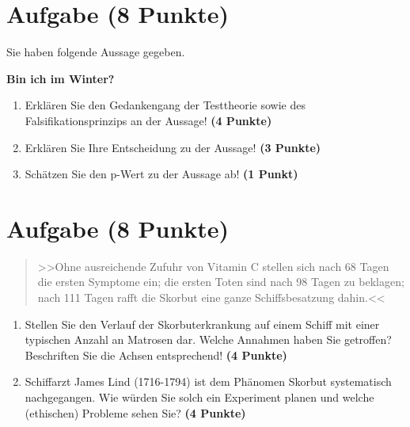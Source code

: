 \documentclass[a4paper, 10pt]{scrartcl}\usepackage[]{graphicx}\usepackage[]{xcolor}
\begin{document}
\clearpage

\section{Aufgabe \hfill (8 Punkte)}



Sie haben folgende Aussage gegeben.

\begin{center}
  \Large\textbf{Bin ich im Winter?}
\end{center}

\begin{enumerate}
\item Erkl{\"a}ren Sie den Gedankengang der Testtheorie sowie des Falsifikationsprinzips an der Aussage! \textbf{(4 Punkte)}
\item Erkl{\"a}ren Sie Ihre Entscheidung zu der Aussage! \textbf{(3 Punkte)}
\item Sch{\"a}tzen Sie den p-Wert zu der Aussage ab! \textbf{(1 Punkt)}
\end{enumerate}

 
\clearpage

\section{Aufgabe \hfill (8 Punkte)}



\begin{quote}
  >>Ohne ausreichende Zufuhr von Vitamin C stellen sich nach 68 Tagen die
  ersten Symptome ein; die ersten Toten sind nach 98 Tagen zu beklagen;
  nach 111 Tagen rafft die Skorbut eine ganze Schiffsbesatzung dahin.<<
\end{quote}


\begin{enumerate}
\item Stellen Sie den Verlauf der Skorbuterkrankung auf einem Schiff mit
  einer typischen Anzahl an Matrosen dar. Welche Annahmen haben
  Sie getroffen? Beschriften Sie die Achsen entsprechend!
  \textbf{(4 Punkte)}
\item Schiffarzt James Lind (1716-1794) ist dem Ph{\"a}nomen Skorbut
  systematisch nachgegangen. Wie w{\"u}rden Sie solch ein Experiment planen und
  welche (ethischen) Probleme sehen Sie? \textbf{(4 Punkte)}
\end{enumerate} 
\clearpage
\end{document}
